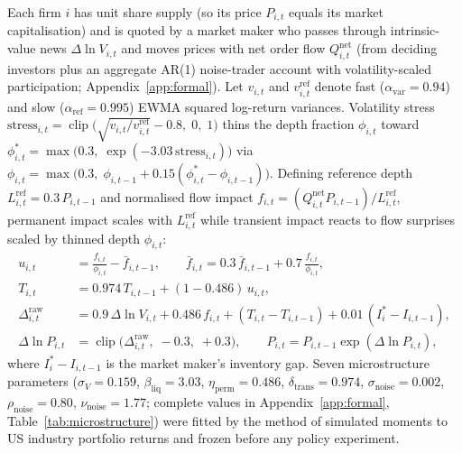 \documentclass[11pt]{article}
\begin{document}
Each firm $i$ has unit share supply (so its price $P_{i,t}$ equals its market capitalisation) and is quoted by a market maker who passes through intrinsic-value news $\Delta\ln V_{i,t}$ and moves prices with net order flow $Q^{\text{net}}_{i,t}$ (from deciding investors plus an aggregate AR(1) noise-trader account with volatility-scaled participation; Appendix~\ref{app:formal}). Let $v_{i,t}$ and $v^{\text{ref}}_{i,t}$ denote fast ($\alpha_{\text{var}} = 0.94$) and slow ($\alpha_{\text{ref}} = 0.995$) EWMA squared log-return variances. Volatility stress $\text{stress}_{i,t} = \operatorname{clip}\big(\sqrt{v_{i,t}/v^{\text{ref}}_{i,t}} - 0.8,\; 0,\; 1\big)$ thins the depth fraction $\phi_{i,t}$ toward $\phi^*_{i,t} = \max\big(0.3,\; \exp(-3.03\,\text{stress}_{i,t})\big)$ via $\phi_{i,t} = \max\big(0.3,\; \phi_{i,t-1} + 0.15(\phi^*_{i,t} - \phi_{i,t-1})\big)$. Defining reference depth $L^{\text{ref}}_{i,t} = 0.3\,P_{i,t-1}$ and normalised flow impact $f_{i,t} = (Q^{\text{net}}_{i,t} P_{i,t-1}) / L^{\text{ref}}_{i,t}$, permanent impact scales with $L^{\text{ref}}_{i,t}$ while transient impact reacts to flow surprises scaled by thinned depth $\phi_{i,t}$:
\begin{align}
u_{i,t} &= \frac{f_{i,t}}{\phi_{i,t}} - \bar f_{i,t-1}, \qquad \bar f_{i,t} = 0.3\,\bar f_{i,t-1} + 0.7\,\frac{f_{i,t}}{\phi_{i,t}}, \nonumber\\
T_{i,t} &= 0.974\,T_{i,t-1} + (1 - 0.486)\,u_{i,t}, \label{eq:impact}\\
\Delta^{\text{raw}}_{i,t} &= 0.9\,\Delta\ln V_{i,t} + 0.486\,f_{i,t} + (T_{i,t} - T_{i,t-1}) + 0.01\,(I^*_i - I_{i,t-1}), \label{eq:rawmove}\\
\Delta\ln P_{i,t} &= \operatorname{clip}\!\big(\Delta^{\text{raw}}_{i,t},\; -0.3,\; +0.3\big), \qquad P_{i,t} = P_{i,t-1}\exp(\Delta\ln P_{i,t}), \label{eq:priceguard}
\end{align}
where $I^*_i - I_{i,t-1}$ is the market maker's inventory gap. Seven microstructure parameters ($\sigma_V = 0.159$, $\beta_{\text{liq}} = 3.03$, $\eta_{\text{perm}} = 0.486$, $\delta_{\text{trans}} = 0.974$, $\sigma_{\text{noise}} = 0.002$, $\rho_{\text{noise}} = 0.80$, $\nu_{\text{noise}} = 1.77$; complete values in Appendix~\ref{app:formal}, Table~\ref{tab:microstructure}) were fitted by the method of simulated moments to US industry portfolio returns and frozen before any policy experiment.
\end{document}
